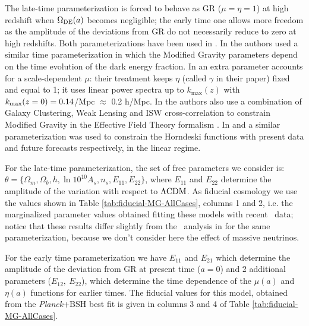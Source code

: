 The late-time parameterization is forced to behave as GR ($\mu=\eta=1$)
at high redshift when $\Omega_{{\rm DE}}(a)$ becomes negligible;
the early time one allows more freedom as the amplitude of the deviations
from GR do not necessarily reduce to zero at high redshifts. Both parameterizations have been used in \cite{planck_collaboration_planck_2016}. In \cite{bull_extending_2015, Gleyzes2016, Alonso2016} the authors used a similar time parameterization in which the Modified Gravity
parameters depend on the time evolution of the dark energy fraction. In \cite{bull_extending_2015} an extra parameter accounts for a scale-dependent $\mu$: their treatment keeps $\eta$ (called $\gamma$ in their paper) fixed and equal to 1; it uses linear power spectra up to $k_{\mathrm{max}}(z)$ with $k_{\rm max}(z=0)=0.14$/Mpc $\approx$ 0.2 h/Mpc. 
In \cite{Gleyzes2016} the authors also use a combination of Galaxy Clustering, Weak Lensing and ISW cross-correlation to constrain
Modified Gravity in the Effective Field Theory formalism \cite{Gubitosi2013}. In \cite{Bellini2016} and \cite{Alonso2016} a similar parameterization was used to constrain the Horndeski functions \cite{Bellini2014} with present data and future forecasts respectively, in the linear regime.


For the late-time parameterization, the set of free parameters we
consider is: $\theta=\{\Omega_{m},\Omega_{b},h,\ln10^{10}A_{s},n_{s},E_{11},E_{22}\}$,
where $E_{11}$ and $E_{22}$ determine the amplitude of the variation
with respect to $\Lambda\mathrm{CDM}$. As fiducial cosmology we use the values
shown in Table \ref{tab:fiducial-MG-AllCases}, columns 1 and 2, i.e.
the marginalized parameter values obtained fitting these models with
recent \planck\ data; notice that these results differ slightly from
the \planck\ analysis in \cite{planck_collaboration_planck_2016} for
the same parameterization, because we don't consider here the effect
of massive neutrinos.

For the early time parameterization we have $E_{11}$ and $E_{21}$
which determine the amplitude of the deviation from GR at present
time ($a=0$) and 2 additional parameters ($E_{12},\ E_{22}$), which
determine the time dependence of the $\mu(a)$ and $\eta(a)$ functions
for earlier times. The
fiducial values for this model, obtained from the {\it Planck}+BSH best
fit is given in columns 3 and 4 of Table \ref{tab:fiducial-MG-AllCases}.


